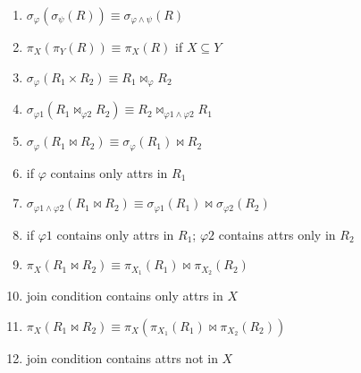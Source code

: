 \begin{minipage}{\linewidth}
\begin{enumerate}[leftmargin=4em]
\item $\sigma_{\varphi}(\sigma_{\psi}(R))\equiv\sigma_{\varphi\wedge\psi}(R)$
\item $\pi_{X}(\pi_{Y}(R))\equiv\pi_{X}(R)$ if $X \subseteq Y$
\item $\sigma_{\varphi}(R_{1}\times R_{2})\equiv R_{1}\bowtie_{\varphi} R_{2}$
\item $\sigma_{\varphi1}(R_{1}\bowtie_{\varphi2} R_{2})\equiv R_{2}\bowtie_{\varphi1\wedge\varphi2} R_{1}$

\item $\sigma_{\varphi}(R_{1}\bowtie R_{2})\equiv\sigma_{\varphi}(R_{1})\bowtie R_{2}$
\item[] if $\varphi$ contains only attrs in $R_{1}$
\item $\sigma_{\varphi1\wedge\varphi2}(R_{1}\bowtie R_{2})\equiv\sigma_{\varphi1}(R_{1})\bowtie\sigma_{\varphi2}(R_{2})$
\item[] if $\varphi1$ contains only attrs in $R_{1}$; $\varphi2$ contains attrs only in  $R_{2}$
\item $\pi_{X}(R_{1}\bowtie R_{2})\equiv \pi_{X_{1}}(R_{1})\bowtie \pi_{X_{2}}(R_{2})$
\item[] join condition contains only attrs in $X$
\item $\pi_{X}(R_{1}\bowtie R_{2})\equiv \pi_{X}(\pi_{X_{1}}(R_{1})\bowtie \pi_{X_{2}}(R_{2}))$
\item[] join condition contains attrs not in $X$
\end{enumerate}
\end{minipage}
